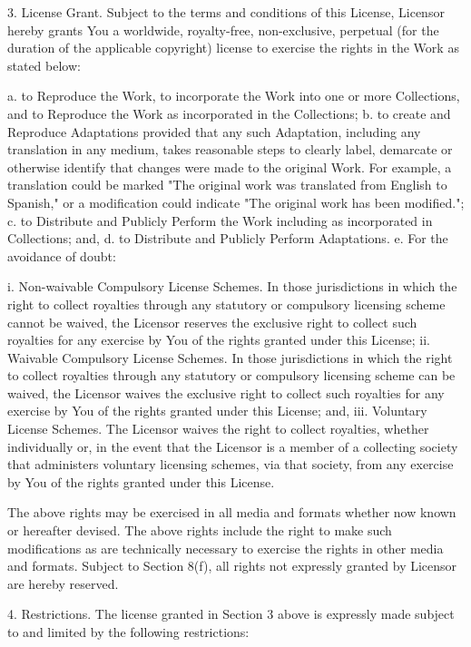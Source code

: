3. License Grant. Subject to the terms and conditions of this License,
Licensor hereby grants You a worldwide, royalty-free, non-exclusive,
perpetual (for the duration of the applicable copyright) license to
exercise the rights in the Work as stated below:

 a. to Reproduce the Work, to incorporate the Work into one or more
    Collections, and to Reproduce the Work as incorporated in the
    Collections;
 b. to create and Reproduce Adaptations provided that any such Adaptation,
    including any translation in any medium, takes reasonable steps to
    clearly label, demarcate or otherwise identify that changes were made
    to the original Work. For example, a translation could be marked "The
    original work was translated from English to Spanish," or a
    modification could indicate "The original work has been modified.";
 c. to Distribute and Publicly Perform the Work including as incorporated
    in Collections; and,
 d. to Distribute and Publicly Perform Adaptations.
 e. For the avoidance of doubt:

     i. Non-waivable Compulsory License Schemes. In those jurisdictions in
        which the right to collect royalties through any statutory or
        compulsory licensing scheme cannot be waived, the Licensor
        reserves the exclusive right to collect such royalties for any
        exercise by You of the rights granted under this License;
    ii. Waivable Compulsory License Schemes. In those jurisdictions in
        which the right to collect royalties through any statutory or
        compulsory licensing scheme can be waived, the Licensor waives the
        exclusive right to collect such royalties for any exercise by You
        of the rights granted under this License; and,
   iii. Voluntary License Schemes. The Licensor waives the right to
        collect royalties, whether individually or, in the event that the
        Licensor is a member of a collecting society that administers
        voluntary licensing schemes, via that society, from any exercise
        by You of the rights granted under this License.

The above rights may be exercised in all media and formats whether now
known or hereafter devised. The above rights include the right to make
such modifications as are technically necessary to exercise the rights in
other media and formats. Subject to Section 8(f), all rights not expressly
granted by Licensor are hereby reserved.

4. Restrictions. The license granted in Section 3 above is expressly made
subject to and limited by the following restrictions:

